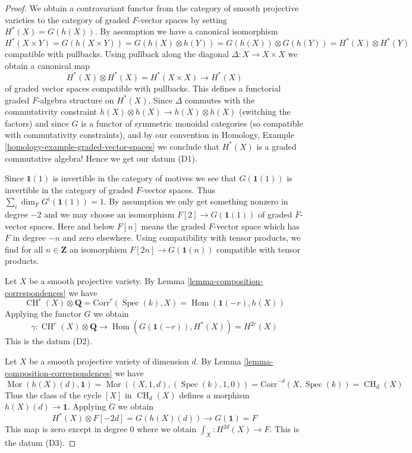 \documentclass{stacks-project}
\theoremstyle{plain}
\theoremstyle{definition}
\theoremstyle{remark}
\numberwithin{equation}{subsection}
\def\Spec{\mathop{\mathrm{Spec}}}
\def\Hom{\mathop{\mathrm{Hom}}\nolimits}
\def\Mor{\mathop{\mathrm{Mor}}\nolimits}
\def\CH{\mathop{\mathrm{CH}}\nolimits}
\begin{document}
\begin{proof}
We obtain a contravariant functor from the category of smooth
projective varieties to the category of graded $F$-vector spaces
by setting $H^*(X) = G(h(X))$. By assumption we have a canonical
isomorphism
$$
H^*(X \times Y) = G(h(X \times Y)) = G(h(X) \otimes h(Y)) =
G(h(X)) \otimes G(h(Y)) = H^*(X) \otimes H^*(Y)
$$
compatible with pullbacks. Using pullback along the diagonal
$\Delta : X \to X \times X$ we obtain a canonical map
$$
H^*(X) \otimes H^*(X) = H^*(X \times X) \to H^*(X)
$$
of graded vector spaces compatible with pullbacks.
This defines a functorial graded $F$-algebra structure on
$H^*(X)$. Since $\Delta$ commutes with the commutativity
constraint $h(X) \otimes h(X) \to h(X) \otimes h(X)$ (switching the factors)
and since $G$ is a functor of symmetric monoidal categories (so compatible with
commutativity constraints), and by our convention in
Homology, Example \ref{homology-example-graded-vector-spaces}
we conclude that $H^*(X)$ is a graded
commutative algebra! Hence we get our datum (D1).

\medskip\noindent
Since $\mathbf{1}(1)$ is invertible in the category of motives
we see that $G(\mathbf{1}(1))$ is invertible in the category of
graded $F$-vector spaces. Thus $\sum_i \dim_F G^i(\mathbf{1}(1)) = 1$.
By assumption we only get something nonzero in degree $-2$ and we may
choose an isomorphism $F[2] \to G(\mathbf{1}(1))$ of graded $F$-vector spaces.
Here and below $F[n]$ means the graded $F$-vector space which has
$F$ in degree $-n$ and zero elsewhere. Using compatibility with
tensor products, we find for all $n \in \mathbf{Z}$ an isomorphism
$F[2n] \to G(\mathbf{1}(n))$ compatible with tensor products.

\medskip\noindent
Let $X$ be a smooth projective variety. By
Lemma \ref{lemma-composition-correspondences} we have
$$
\CH^r(X) \otimes \mathbf{Q} = \text{Corr}^r(\Spec(k), X) =
\Hom(\mathbf{1}(-r), h(X))
$$
Applying the functor $G$ we obtain
$$
\gamma :
\CH^r(X) \otimes \mathbf{Q} \longrightarrow
\Hom(G(\mathbf{1}(-r)), H^*(X)) = H^{2r}(X)
$$
This is the datum (D2).

\medskip\noindent
Let $X$ be a smooth projective variety of dimension $d$. By
Lemma \ref{lemma-composition-correspondences} we have
$$
\Mor(h(X)(d), \mathbf{1}) = \Mor((X, 1, d), (\Spec(k), 1, 0)) =
\text{Corr}^{-d}(X, \Spec(k)) = \CH_d(X)
$$
Thus the class of the cycle $[X]$ in $\CH_d(X)$ defines a morphism
$h(X)(d) \to \mathbf{1}$. Applying $G$ we obtain
$$
H^*(X) \otimes F[-2d] = G(h(X)(d)) \longrightarrow G(\mathbf{1}) = F
$$
This map is zero except in degree $0$ where we obtain
$\int_X : H^{2d}(X) \to F$. This is the datum (D3).


\end{proof}
\end{document}

